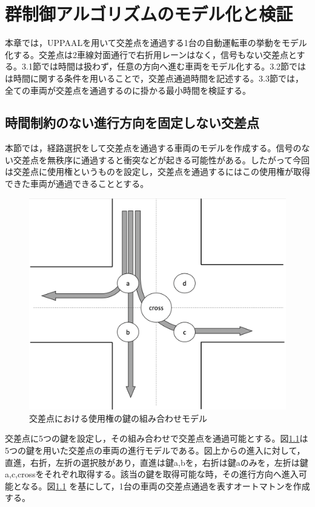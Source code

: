 \documentclass{tpu-sotu}
\begin{document}
\chapter{群制御アルゴリズムのモデル化と検証}
本章では，UPPAALを用いて交差点を通過する1台の自動運転車の挙動をモデル化する。交差点は2車線対面通行で右折用レーンはなく，信号もない交差点とする。3.1節では時間は扱わず，任意の方向へ進む車両をモデル化する。3.2節ではは時間に関する条件を用いることで，交差点通過時間を記述する。3.3節では，全ての車両が交差点を通過するのに掛かる最小時間を検証する。
	\section{時間制約のない進行方向を固定しない交差点}
	本節では，経路選択をして交差点を通過する車両のモデルを作成する。信号のない交差点を無秩序に通過すると衝突などが起きる可能性がある。したがって今回は交差点に使用権というものを設定し，交差点を通過するにはこの使用権が取得できた車両が通過できることとする。
	
	\begin{figure}[htbp]
	\centering
	\includegraphics[width=120mm]{IntersectionM.png}
	\caption{交差点における使用権の鍵の組み合わせモデル}
	\label{IM}
	\end{figure}
	交差点に5つの鍵を設定し，その組み合わせで交差点を通過可能とする。図\ref{IM}は5つの鍵を用いた交差点の車両の進行モデルである。図上からの進入に対して，直進，右折，左折の選択肢があり，直進は鍵a,bを，右折は鍵aのみを，左折は鍵a,c,crossをそれぞれ取得する。該当の鍵を取得可能な時，その進行方向へ進入可能となる。図\ref{IM} を基にして，1台の車両の交差点通過を表すオートマトンを作成する。
\end{document}

